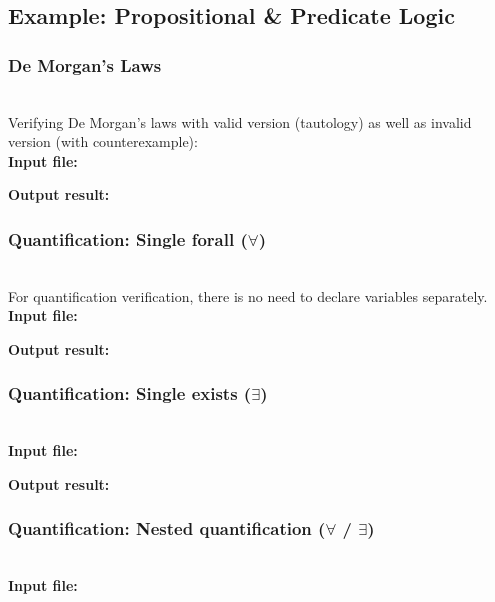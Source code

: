 


\subsection{Example: Propositional \& Predicate Logic}

\subsubsection{De Morgan's Laws}
~\\Verifying De Morgan's laws with valid version (tautology) as well as invalid version (with counterexample): \\
{\bf Input file:}


{\bf Output result:}


\subsubsection{Quantification: Single forall ($\forall$)}
~\\For quantification verification, there is no need to declare variables separately.
{\bf Input file:}


{\bf Output result:}



\subsubsection{Quantification: Single exists ($\exists$)}
~\\
{\bf Input file:}


{\bf Output result:}


\subsubsection{Quantification: Nested quantification ($\forall$ / $\exists$)}
~\\
{\bf Input file:}


